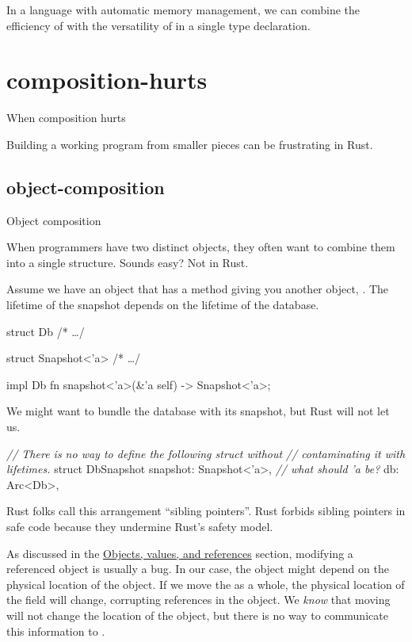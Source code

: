 \documentclass{article}
\begin{document}
In a language with automatic memory management, we can combine the efficiency of  with the versatility of  in a single type declaration.

\section{composition-hurts}{When composition hurts}

Building a working program from smaller pieces can be frustrating in Rust.

\subsection{object-composition}{Object composition}

When programmers have two distinct objects, they often want to combine them into a single structure.
Sounds easy? Not in Rust.

Assume we have an object  that has a method giving you another object, .
The lifetime of the snapshot depends on the lifetime of the database.

\begin{code}[rust]
struct Db { /* \ldots  */ }

struct Snapshot<'a> { /* \ldots  */ }

impl Db { fn snapshot<'a>(&'a self) -> Snapshot<'a>; }
\end{code}

We might want to bundle the database with its snapshot, but Rust will not let us.

\begin{code}[bad]
\emph{// There is no way to define the following struct without}
\emph{// contaminating it with lifetimes.}
struct DbSnapshot {
  snapshot: Snapshot<'a>, \emph{// what should 'a be?}
  db: Arc<Db>,
}
\end{code}

Rust folks call this arrangement ``sibling pointers''.
Rust forbids sibling pointers in safe code because they undermine Rust's safety model.

As discussed in the \href{#objects-values-references}{Objects, values, and references} section, modifying a referenced object is usually a bug.
In our case, the  object might depend on the physical location of the  object.
If we move the  as a whole, the physical location of the  field will change, corrupting references in the  object.
We \emph{know} that moving  will not change the location of the  object, but there is no way to communicate this information to .
\end{document}
